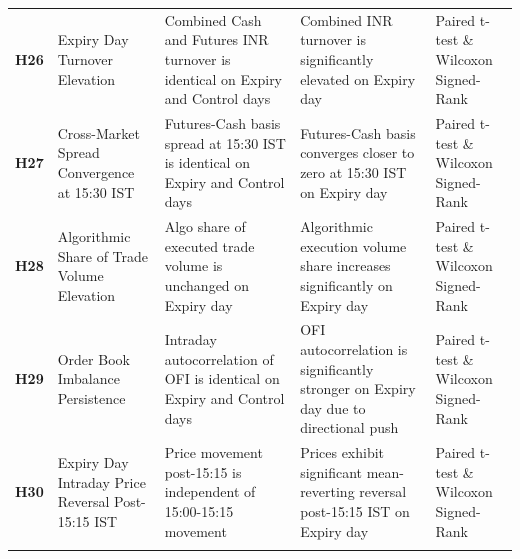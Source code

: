 \documentclass[11pt,a4paper]{article}
\begin{document}
\begin{longtable}{p{0.8cm} p{3.2cm} p{4.2cm} p{4.2cm} p{2.8cm}}
\addlinespace[3pt]
\textbf{H26} & Expiry Day Turnover Elevation & Combined Cash and Futures INR turnover is identical on Expiry and Control days & Combined INR turnover is significantly elevated on Expiry day & Paired t-test \& Wilcoxon Signed-Rank \\
\addlinespace[3pt]
\textbf{H27} & Cross-Market Spread Convergence at 15:30 IST & Futures-Cash basis spread at 15:30 IST is identical on Expiry and Control days & Futures-Cash basis converges closer to zero at 15:30 IST on Expiry day & Paired t-test \& Wilcoxon Signed-Rank \\
\addlinespace[3pt]
\textbf{H28} & Algorithmic Share of Trade Volume Elevation & Algo share of executed trade volume is unchanged on Expiry day & Algorithmic execution volume share increases significantly on Expiry day & Paired t-test \& Wilcoxon Signed-Rank \\
\addlinespace[3pt]
\textbf{H29} & Order Book Imbalance Persistence & Intraday autocorrelation of OFI is identical on Expiry and Control days & OFI autocorrelation is significantly stronger on Expiry day due to directional push & Paired t-test \& Wilcoxon Signed-Rank \\
\addlinespace[3pt]
\textbf{H30} & Expiry Day Intraday Price Reversal Post-15:15 IST & Price movement post-15:15 is independent of 15:00-15:15 movement & Prices exhibit significant mean-reverting reversal post-15:15 IST on Expiry day & Paired t-test \& Wilcoxon Signed-Rank \\
\addlinespace[3pt]
\end{longtable}
\end{document}
